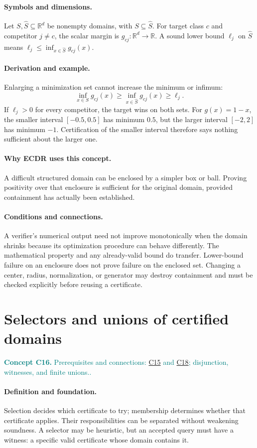 \documentclass[11pt,a4paper]{article}
\newcommand{\R}{\mathbb R}
\newcommand{\conceptid}{Front matter}
\newcommand{\concept}[3]{\clearpage\renewcommand{\conceptid}{#1}%
\section{#2}\label{concept:#1}%
\textcolor{teal}{\textbf{Concept #1.} Prerequisites and connections: #3.}\par
\typeout{ECDR-CONCEPT-START #1 PAGE=\thepage}}
\begin{document}
\paragraph{Symbols and dimensions.}
Let $S,\widehat S\subseteq\R^d$ be nonempty domains, with $S\subseteq\widehat S$. For target class $c$ and competitor $j\ne c$, the scalar margin is $g_{cj}:\R^d\to\R$. A sound lower bound $\ell_j$ on $\widehat S$ means $\ell_j\le\inf_{x\in\widehat S}g_{cj}(x)$.
\paragraph{Derivation and example.}
Enlarging a minimization set cannot increase the minimum or infimum:
\[
 \inf_{x\in S}g_{cj}(x)\ge
 \inf_{x\in\widehat S}g_{cj}(x)\ge\ell_j.
\]
If $\ell_j>0$ for every competitor, the target wins on both sets. For $g(x)=1-x$, the smaller interval $[-0.5,0.5]$ has minimum $0.5$, but the larger interval $[-2,2]$ has minimum $-1$. Certification of the smaller interval therefore says nothing sufficient about the larger one.
\paragraph{Why ECDR uses this concept.}
A difficult structured domain can be enclosed by a simpler box or ball. Proving positivity over that enclosure is sufficient for the original domain, provided containment has actually been established.
\paragraph{Conditions and connections.}
A verifier's numerical output need not improve monotonically when the domain shrinks because its optimization procedure can behave differently. The mathematical property and any already-valid bound do transfer. Lower-bound failure on an enclosure does not prove failure on the enclosed set. Changing a center, radius, normalization, or generator may destroy containment and must be checked explicitly before reusing a certificate.
\par\label{endconcept:C15}

\concept{C16}{Selectors and unions of certified domains}{\hyperref[concept:C15]{C15} and \hyperref[concept:C18]{C18}; disjunction, witnesses, and finite unions.}
\paragraph{Definition and foundation.}
Selection decides which certificate to try; membership determines whether that certificate applies. Their responsibilities can be separated without weakening soundness. A selector may be heuristic, but an accepted query must have a witness: a specific valid certificate whose domain contains it.
\end{document}
